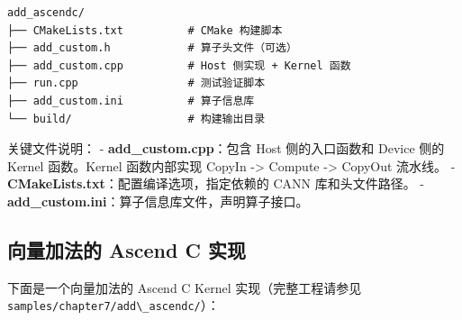 \begin{lstlisting}
add_ascendc/
├── CMakeLists.txt          # CMake 构建脚本
├── add_custom.h            # 算子头文件（可选）
├── add_custom.cpp          # Host 侧实现 + Kernel 函数
├── run.cpp                 # 测试验证脚本
├── add_custom.ini          # 算子信息库
└── build/                  # 构建输出目录
\end{lstlisting}

关键文件说明： - \textbf{add\_custom.cpp}：包含 Host 侧的入口函数和
Device 侧的 Kernel 函数。Kernel 函数内部实现 CopyIn -\textgreater{}
Compute -\textgreater{} CopyOut 流水线。 -
\textbf{CMakeLists.txt}：配置编译选项，指定依赖的 CANN 库和头文件路径。
- \textbf{add\_custom.ini}：算子信息库文件，声明算子接口。

\subsection{向量加法的 Ascend C 实现}\label{src-book-chapter7-h49}

下面是一个向量加法的 Ascend C Kernel 实现（完整工程请参见
\passthrough{\lstinline!samples/chapter7/add\_ascendc/!}）：

